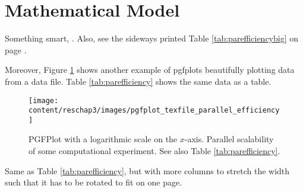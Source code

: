\section{Mathematical Model}
Something smart, \cite{DoeJane2001}. Also, see the sideways printed Table \ref{tab:parefficiencybig} on page \pageref{tab:parefficiencybig}.

Moreover, Figure \ref{fig:parefficiency} shows another example of pgfplots beautifully plotting data from a data file. Table \ref{tab:parefficiency} shows the same data as a table.



\begin{figure}[p]
 \centering
 \texttt{[image: content/reschap3/images/pgfplot\_texfile\_parallel\_efficiency]}
 \caption[PGFPlot with a logarithmic scale on the $x$-axis. Parallel scalability of some computational experiment.]{PGFPlot with a logarithmic scale on the $x$-axis. Parallel scalability of some computational experiment. See also Table \ref{tab:parefficiency}.}
 \label{fig:parefficiency}
\end{figure}

\begin{sidewaystable}[p]
  \centering
  \pgftablepareffbigger
  
  \pgfplotstabletypeset[columns={simid, speed-up, num_nodes_per_core, no_cores, pareff, totalwalltime, solve_time, newfraction, num_nodes, nodes2},
  ]\pgftablepareffbigger
  \caption{Same as Table \ref{tab:parefficiency}, but with more columns to stretch the width such that it has to be rotated to fit on one page.}
  \label{tab:parefficiencybig}
\end{sidewaystable}
